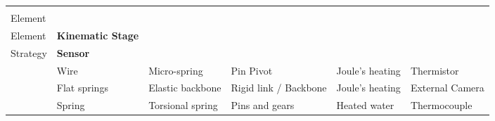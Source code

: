 \documentclass[border=1mm,
               class=article
               preview]{standalone}
\begin{document}
\renewcommand{\arraystretch}{1.5}
 {\footnotesize{}
\begin{tabular}{p{}
                p{}
                p{}
                p{}
                p{}
                p{}}
   \rowcolor{black}  & \textbf{\color{white} \parbox[t]{1.5cm}{Active\\Element}} & \textbf{\color{white} \parbox[t]{1.5cm}{Biasing\\Element}} & \textbf{\color{white} Kinematic Stage} & \textbf{\color{white} \parbox[t]{1.5cm}{Heating\\Strategy}} & \textbf{\color{white} Sensor}\\
   \cite{liuMesoscaleShapeMemory2019} & Wire & Micro-spring & Pin Pivot & Joule's heating & Thermistor\\
   \cite{abdulkadirMultisegmentedShapeMemory2019b} & Flat springs & Elastic backbone & Rigid link / Backbone & Joule's heating & External Camera\\
   \cite{roshanDesignFabricationMinimally2018} & Spring & Torsional spring & Pins and gears & Heated water & Thermocouple\\
\end{tabular}}
\renewcommand{\arraystretch}{1}
\end{document}
